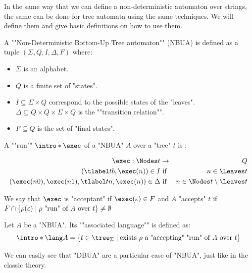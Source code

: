 \documentclass[twoside]{article}
\begin{document}
In the same way that we can define a non-deterministic automaton over strings, the same can be done for
tree automata using the same techniques. We will define them and give basic definitions on how to use them.

\begin{definition}
	\AP A ""Non-Deterministic Bottom-Up Tree automaton"" (NBUA) is defined as a tuple
	$(\Sigma, Q, I, \Delta, F)$ where:
	\begin{itemize}
		\item $\Sigma$ is an alphabet.
		\item $Q$ is a finite set of "states".
		\item $I \subseteq \Sigma \times Q$ correspond to the possible states of the "leaves".
		      \itemAP $\Delta \subseteq Q \times Q \times \Sigma \times Q$ is the ""transition relation"".
		\item $F \subseteq Q$ is the set of "final states".
	\end{itemize}
\end{definition}

\begin{definition}
	\AP A ""run"" $\intro* \exec$ of a "NBUA" $A$ over a "tree" $t$ is :

	\begin{eqnarray*}
		\exec : \Nodes t &\to& Q \\
		(\tlabel t b,  \exec (n) ) \in I &\text{ if }& n \in \Leaves t \\
		(\exec (n0), \exec (n1), \tlabel t n, \exec (n)) \in \Delta &\text{ if }& n \in \Nodes t \setminus \Leaves t
	\end{eqnarray*}

	We say that $\exec$ is "acceptant" if $\exec (\varepsilon) \in F$ and $A$ "accepts" $t$ if
	$F \cap \left\{\rho(\varepsilon) \mid \text{$\rho$ "run" of~$A$ over~$t$}\right\} \neq \emptyset$
\end{definition}


\begin{definition}
	\AP Let $A$ be a "NBUA". Its ""associated language"" is defined as:
	\[\intro* \lang A = \setdef {t \in \tree_{\Sigma}} {\text{exists $\rho$ a "accepting" "run" of $A$ over $t$}} \]
\end{definition}

We can easily see that "DBUA" are a particular case of "NBUA", just like in the classic theory.
\end{document}
